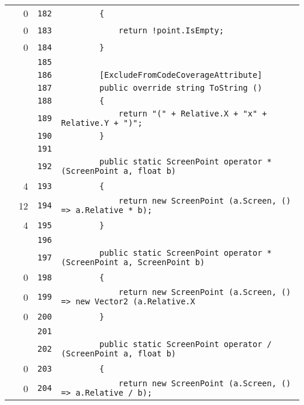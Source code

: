 \documentclass[a4paper,10pt]{article}
\begin{document}
\begin{longtable}[l]{lrrl}
\cellcolor{red} & 0 & \verb~182~ & \verb~        {~\\
\cellcolor{red} & 0 & \verb~183~ & \verb~            return !point.IsEmpty;~\\
\cellcolor{red} & 0 & \verb~184~ & \verb~        }~\\
\cellcolor{gray} &  & \verb~185~ & \verb~~\\
\cellcolor{gray} &  & \verb~186~ & \verb~        [ExcludeFromCodeCoverageAttribute]~\\
\cellcolor{gray} &  & \verb~187~ & \verb~        public override string ToString ()~\\
\cellcolor{gray} &  & \verb~188~ & \verb~        {~\\
\cellcolor{gray} &  & \verb~189~ & \verb~            return "(" + Relative.X + "x" + Relative.Y + ")";~\\
\cellcolor{gray} &  & \verb~190~ & \verb~        }~\\
\cellcolor{gray} &  & \verb~191~ & \verb~~\\
\cellcolor{gray} &  & \verb~192~ & \verb~        public static ScreenPoint operator * (ScreenPoint a, float b)~\\
\cellcolor{green} & 4 & \verb~193~ & \verb~        {~\\
\cellcolor{green} & 12 & \verb~194~ & \verb~            return new ScreenPoint (a.Screen, () => a.Relative * b);~\\
\cellcolor{green} & 4 & \verb~195~ & \verb~        }~\\
\cellcolor{gray} &  & \verb~196~ & \verb~~\\
\cellcolor{gray} &  & \verb~197~ & \verb~        public static ScreenPoint operator * (ScreenPoint a, ScreenPoint b)~\\
\cellcolor{red} & 0 & \verb~198~ & \verb~        {~\\
\cellcolor{red} & 0 & \verb~199~ & \verb~            return new ScreenPoint (a.Screen, () => new Vector2 (a.Relative.X ~\\
\cellcolor{red} & 0 & \verb~200~ & \verb~        }~\\
\cellcolor{gray} &  & \verb~201~ & \verb~~\\
\cellcolor{gray} &  & \verb~202~ & \verb~        public static ScreenPoint operator / (ScreenPoint a, float b)~\\
\cellcolor{red} & 0 & \verb~203~ & \verb~        {~\\
\cellcolor{red} & 0 & \verb~204~ & \verb~            return new ScreenPoint (a.Screen, () => a.Relative / b);~\\

\end{longtable}
\end{document}
